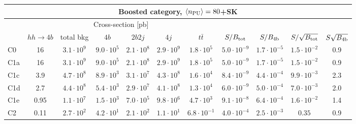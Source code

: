 \begin{tabular}{|l|cc|cccc|cccc|}
  \hline
\multicolumn{11}{|c|}{Boosted category, $\left\langle n_{\rm PU}\right\rangle=80$+SK}\\
\hline
&  \multicolumn{6}{c|}{Cross-section [pb]} &  &  & &  \\
   &  $hh\to 4b$ &  total bkg  &   $4b$    &  $2b2j$   &   $4j$    &
$t\bar{t}$ &
$S/B_{\rm tot}$ & $S/B_{\rm 4b}$ & $S/\sqrt{B_{\rm tot}}$ & $S\sqrt{B_{\rm 4b}}$ \\
  \hline
  \hline
 C0      & 16  &   $3.1\cdot 10^9$   & $9.0\cdot 10^5$ & $2.1\cdot 10^8$ & $2.9\cdot 10^9$ & $1.8\cdot 10^5$ &   $5.0\cdot 10^{-9}$   & $1.7\cdot 10^{-5}$  &   $1.5\cdot 10^{-2}$   & 0.9 \\
 C1a     & 16  &   $3.1\cdot 10^9 $  & $9.0\cdot 10^5$ & $2.1\cdot 10^8$ & $2.9\cdot 10^9$ & $1.8\cdot 10^5$ &   $5.0\cdot 10^{-9}$   & $1.7\cdot 10^{-5}$   &   $1.5\cdot 10^{-2}$   & 0.9 \\
 C1c     & 3.9  &   $4.7\cdot 10^8 $  & $8.9\cdot 10^3$ & $3.1\cdot 10^7$ & $4.3\cdot 10^8$ & $1.6\cdot 10^4$   &  $ 8.4\cdot 10^{-9}$   & $4.4\cdot 10^{-4}$  &  $ 9.9\cdot 10^{-3}$   & 2.3 \\
 C1d     & 2.7  &   $4.4\cdot 10^8 $  & $5.4\cdot 10^3$ & $2.9\cdot 10^7$ & $4.1\cdot 10^8$ & $1.3\cdot 10^4$ &   $6.0\cdot 10^{-9}$   & $5.0\cdot 10^{-4}$  &   $7.0\cdot 10^{-3}$   & 2.0 \\
 C1e     & 0.95  &   $1.1\cdot 10^7$   & $1.5\cdot 10^3$ & $7.0\cdot 10^5$ & $9.8\cdot 10^6$ & $4.7\cdot 10^3$  &  $ 9.1\cdot 10^{-8}$   & $6.4\cdot 10^{-4}$  &   $1.6\cdot 10^{-2}$   & 1.4 \\
 C2      & 0.11  &   $2.7\cdot 10^2$   & $4.2\cdot 10^1$ & $2.1\cdot 10^2$ & $1.1\cdot 10^1$ & $6.8\cdot 10^{-1}$  &  $ 4.0\cdot 10^{-4}$   & $2.5\cdot 10^{-3}$  &   $0.35$   & 0.9 \\
\hline
\end{tabular}
